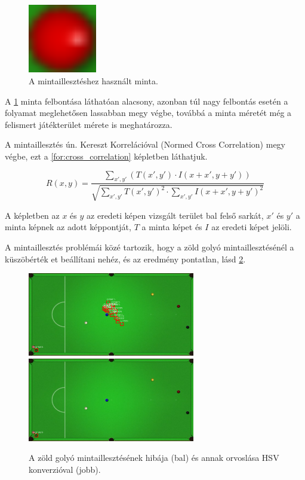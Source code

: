 \begin{figure}[!ht]
    \centering
    \includegraphics[width=30mm, keepaspectratio]{figures/template_red.png}
    \caption{A mintaillesztéshez használt minta.}
    \label{fig:minta_kep}
\end{figure}

\par A \ref{fig:minta_kep} minta felbontása láthatóan alacsony, azonban túl nagy felbontás esetén a folyamat meglehetősen lassabban megy végbe, továbbá a minta méretét még a felismert játékterület mérete is meghatározza.
\par A mintaillesztés ún. Kereszt Korrelációval (Normed Cross Correlation) megy végbe, ezt a \ref{for:cross_correlation} képletben láthatjuk\cite{kaehler2016learning, opencv_docs}.

\begin{equation}
    R(x, y) = \frac{\sum_{x',y'}(T(x',y') \cdot I(x + x', y + y'))}{\sqrt{\sum_{x',y'}T(x',y')^2 \cdot \sum_{x',y'}I(x + x',y + y')^2}}
    \label{for:cross_correlation}
\end{equation}

\par A képletben az $x$ és $y$ az eredeti képen vizsgált terület bal felső sarkát, $x'$ és $y'$ a minta képnek az adott képpontját, $T$ a minta képet és $I$ az eredeti képet jelöli.
\par A mintaillesztés problémái közé tartozik, hogy a zöld golyó mintaillesztésénél a küszöbérték et beállítani nehéz, és az eredmény pontatlan, lásd \ref{fig:rossz_zold}.

\begin{figure}[!ht]
    \centering
    \includegraphics[width=73mm, keepaspectratio]{figures/wrong_green.png}\hspace{2mm}
	\includegraphics[width=73mm, keepaspectratio]{figures/green_ok.png}\\\vspace{5mm}
    \caption{A zöld golyó mintaillesztésének hibája (bal) és annak orvoslása HSV konverzióval (jobb).}
    \label{fig:rossz_zold}
\end{figure}

